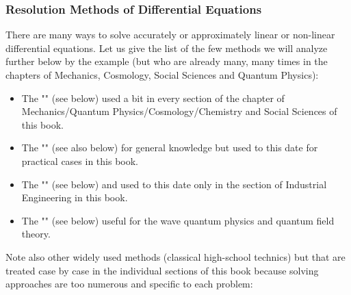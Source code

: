 	\subsubsection{Resolution Methods of Differential Equations}
	There are many ways to solve accurately or approximately linear or non-linear differential equations. Let us give the list of the few methods we will analyze further below by the example (but who are already many, many times in the chapters of Mechanics, Cosmology, Social Sciences and Quantum Physics):
	\begin{itemize}
		\item The "" (see below) used a bit in every section of the chapter of Mechanics/Quantum Physics/Cosmology/Chemistry and Social Sciences of this book.
		
		\item The "" (see also below) for general knowledge but used to this date for practical cases in this book.
		
		\item The "" (see below) and used to this date only in the section of Industrial Engineering in this book.
		
		\item The "" (see below) useful for the wave quantum physics and quantum field theory.
	\end{itemize}
	
	Note also other widely used methods (classical high-school technics) but that are treated case by case in the individual sections of this book because solving approaches are too numerous and specific to each problem:
	
